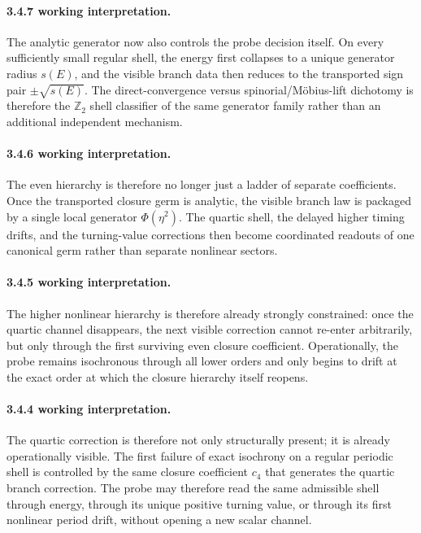 \paragraph{3.4.7 working interpretation.}
The analytic generator now also controls the probe decision itself. On every sufficiently small regular shell, the energy first collapses to a unique generator radius $s(E)$, and the visible branch data then reduces to the transported sign pair $\pm\sqrt{s(E)}$. The direct-convergence versus spinorial/M\"obius-lift dichotomy is therefore the $\mathbb Z_2$ shell classifier of the same generator family rather than an additional independent mechanism.

\paragraph{3.4.6 working interpretation.}
The even hierarchy is therefore no longer just a ladder of separate coefficients. Once the transported closure germ is analytic, the visible branch law is packaged by a single local generator $\Phi(\eta^2)$. The quartic shell, the delayed higher timing drifts, and the turning-value corrections then become coordinated readouts of one canonical germ rather than separate nonlinear sectors.

\paragraph{3.4.5 working interpretation.}
The higher nonlinear hierarchy is therefore already strongly constrained: once the quartic channel disappears, the next visible correction cannot re-enter arbitrarily, but only through the first surviving even closure coefficient. Operationally, the probe remains isochronous through all lower orders and only begins to drift at the exact order at which the closure hierarchy itself reopens.

\paragraph{3.4.4 working interpretation.}
The quartic correction is therefore not only structurally present; it is already operationally visible. The first failure of exact isochrony on a regular periodic shell is controlled by the same closure coefficient $c_4$ that generates the quartic branch correction. The probe may therefore read the same admissible shell through energy, through its unique positive turning value, or through its first nonlinear period drift, without opening a new scalar channel.


